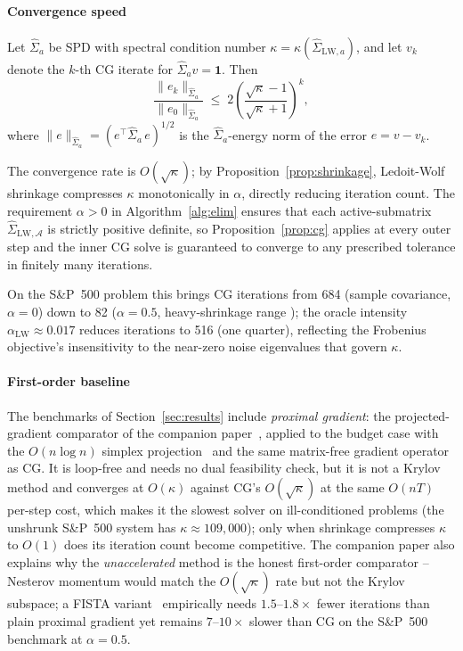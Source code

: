 \paragraph{Convergence speed}
\begin{proposition}\label{prop:cg}
  Let $\hat\Sigma_a$ be SPD with spectral condition number
  $\kappa = \kappa(\hat\Sigma_{\mathrm{LW},a})$, and let $v_k$ denote the $k$-th CG
  iterate for $\hat\Sigma_a v = \mathbf{1}$. Then
  \[
    \frac{\lVert e_k\rVert_{\hat\Sigma_a}}{\lVert e_0\rVert_{\hat\Sigma_a}}
    \;\leq\;
    2\!\left(\frac{\sqrt{\kappa}-1}{\sqrt{\kappa}+1}\right)^{\!k},
  \]
  where $\lVert e\rVert_{\hat\Sigma_a} = (e^\top\hat\Sigma_a\,e)^{1/2}$ is the
  $\hat\Sigma_a$-energy norm of the error $e = v - v_k$.
\end{proposition}
The convergence rate is $O(\sqrt{\kappa})$; by Proposition~\ref{prop:shrinkage},
Ledoit-Wolf shrinkage compresses $\kappa$ monotonically in $\alpha$, directly reducing
iteration count. The requirement $\alpha > 0$ in Algorithm~\ref{alg:elim} ensures that each
active-submatrix $\hat\Sigma_{\mathrm{LW},\mathcal{A}}$ is strictly positive definite,
so Proposition~\ref{prop:cg} applies at every outer step and the inner CG solve is
guaranteed to converge to any prescribed tolerance in finitely many iterations.

On the S\&P~500 problem this brings CG iterations from 684 (sample
covariance, $\alpha=0$) down to 82 ($\alpha=0.5$, heavy-shrinkage range \cite{demiguel2009,ledoit2003jpm});
the oracle intensity $\alpha_{\mathrm{LW}} \approx 0.017$ reduces iterations
to 516 (one quarter), reflecting the Frobenius objective's insensitivity to
the near-zero noise eigenvalues that govern $\kappa$.

\paragraph{First-order baseline}
The benchmarks of Section~\ref{sec:results} include \emph{proximal gradient}: the
projected-gradient comparator of the companion paper~\cite[Section~5]{schmelzer2026nncg},
applied to the budget case with the $O(n\log n)$ simplex
projection~\cite{duchi2008,condat2016} and the same matrix-free gradient operator as CG.
It is loop-free and needs no dual feasibility check, but it is not a Krylov method and
converges at $O(\kappa)$ against CG's $O(\sqrt{\kappa})$ at the same $O(nT)$ per-step
cost, which makes it the slowest solver on ill-conditioned problems (the unshrunk
S\&P~500 system has $\kappa \approx 109{,}000$); only when shrinkage compresses $\kappa$
to $O(1)$ does its iteration count become competitive. The companion paper also
explains why the \emph{unaccelerated} method is the honest first-order comparator --
Nesterov momentum would match the $O(\sqrt\kappa)$ rate but not the Krylov subspace; a
FISTA variant~\cite{beck2009} empirically needs $1.5$--$1.8\times$ fewer
iterations than plain proximal gradient yet remains $7$--$10\times$ slower than CG on
the S\&P~500 benchmark at $\alpha=0.5$.


